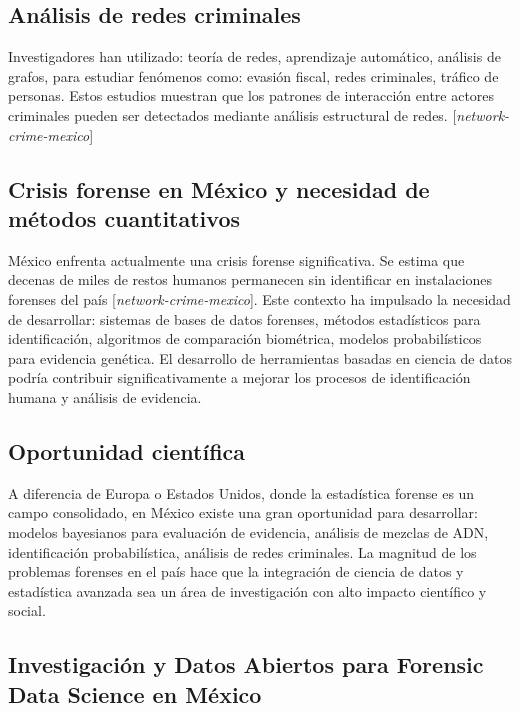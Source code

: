 \documentclass[a4paper,10pt,oneside]{article}
\begin{document}
\subsection{An\'alisis de redes criminales}

Investigadores han utilizado: teor\'ia de redes, aprendizaje autom\'atico, an\'alisis de grafos, para estudiar fen\'omenos como: evasi\'on fiscal, redes criminales, tr\'afico de personas. Estos estudios muestran que los patrones de interacci\'on entre actores criminales pueden ser detectados mediante an\'alisis estructural de redes. [\textit{network-crime-mexico}]

\subsection{Crisis forense en M\'exico y necesidad de m\'etodos cuantitativos}

M\'exico enfrenta actualmente una crisis forense significativa. Se estima que decenas de miles de restos humanos permanecen sin identificar en instalaciones forenses del pa\'is [\textit{network-crime-mexico}]. Este contexto ha impulsado la necesidad de desarrollar: sistemas de bases de datos forenses, m\'etodos estad\'isticos para identificaci\'on, algoritmos de comparaci\'on biom\'etrica,  modelos probabil\'isticos para evidencia gen\'etica. El desarrollo de herramientas basadas en ciencia de datos podr\'ia contribuir significativamente a mejorar los procesos de identificaci\'on humana y an\'alisis de evidencia.

\subsection{Oportunidad cient\'ifica}

A diferencia de Europa o Estados Unidos, donde la estad\'istica forense es un campo consolidado, en M\'exico existe una gran oportunidad para desarrollar: modelos bayesianos para evaluaci\'on de evidencia, an\'alisis de mezclas de ADN, identificaci\'on probabil\'istica, an\'alisis de redes criminales. La magnitud de los problemas forenses en el pa\'is hace que la integraci\'on de ciencia de datos y estad\'istica avanzada sea un \'area de investigaci\'on con alto impacto cient\'ifico y social.

\subsection{Investigaci\'on y Datos Abiertos para Forensic Data Science en M\'exico}
\end{document}
